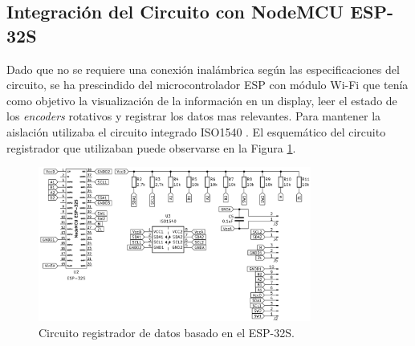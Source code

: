 \subsection{Integración del Circuito con NodeMCU ESP-32S}
Dado que no se requiere una conexión inalámbrica según las especificaciones del circuito, se ha prescindido del microcontrolador ESP con módulo Wi-Fi que tenía como objetivo la visualización de la información en un display, leer el estado de los \textit{encoders} rotativos y registrar los datos mas relevantes. Para mantener la aislación utilizaba el circuito integrado ISO1540 \cite{ISO1540}. El esquemático del circuito registrador que utilizaban puede observarse en la Figura \ref{F:ESP_32S}.
\begin{figure}[H]
    \centering
    \includegraphics[width=0.8\textwidth]{./imagenes/ESP_32S.png}
    \caption{Circuito registrador de datos basado en el ESP-32S.}
    \label{F:ESP_32S}
\end{figure}

